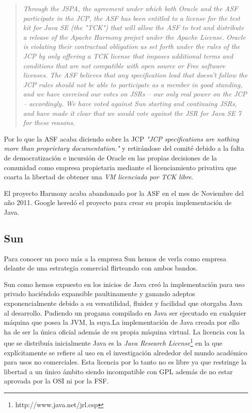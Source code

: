 \documentclass[11pt]{scrartcl}
\begin{document}
\begin{quotation}
    \emph{Through the JSPA, the agreement under which both Oracle and the ASF participate in the JCP, the ASF has been entitled to a license for the test kit for Java SE (the "TCK") that will allow the ASF to test and distribute a release of the Apache Harmony project under the Apache License. Oracle is violating their contractual obligation as set forth under the rules of the JCP by only offering a TCK license that imposes additional terms and conditions that are not compatible with open source or Free software licenses. The ASF believes that any specification lead that doesn't follow the JCP rules should not be able to participate as a member in good standing, and we have exercised our votes on JSRs -- our only real power on the JCP -- accordingly.  We have voted against Sun starting and continuing JSRs, and have made it clear that we would vote against the JSR for Java SE 7 for these reasons.}
\end{quotation}

Por lo que la ASF acaba diciendo sobre la JCP \emph{"JCP specifications are nothing more than proprietary documentation."} y retirándose del comité debido a la falta de democratización e incursión de Oracle en las propias decisiones de la comunidad como empresa propietaria mediante el licenciamiento privativa que coarta la libertad de obtener una \emph{VM licenciada por TCK libre}.

El proyecto Harmony acaba abandonado por la ASF en el mes de Noviembre del año 2011. Google heredó el proyecto para crear su propia implementación de Java. 

\subsection{Sun}

Para conocer un poco más a la empresa Sun hemos de verla como empresa delante de una estrategia comercial flirteando con ambos bandos.

Sun como hemos expuesto en los inicios de Java creó la implementación para uso privado haciéndolo expansible paultinamente y ganando adeptos exponencialmente debido a su versatilidad, fluidez y facilidad que otorgaba Java al desarrollo. Pudiendo un progama compilado en Java ser ejecutado en cualquier máquina que posea la JVM, la suya.La implementación de Java creada por ello ha de ser la única oficial además de su propia máquina virtual.
La licencia con la que se distribuía inicialmente Java es la \emph{Java Research License}\footnote{http://www.java.net/jrl.csp} en la que explícitamente se refiere al uso en el investigación alrededor del mundo académico para usos no comerciales. Esta licencia por lo tanto no es libre ya que restringe la libertad a un único ámbito siendo incompatible con GPL además de no estar aprovada por la OSI ni por la FSF.
\end{document}
